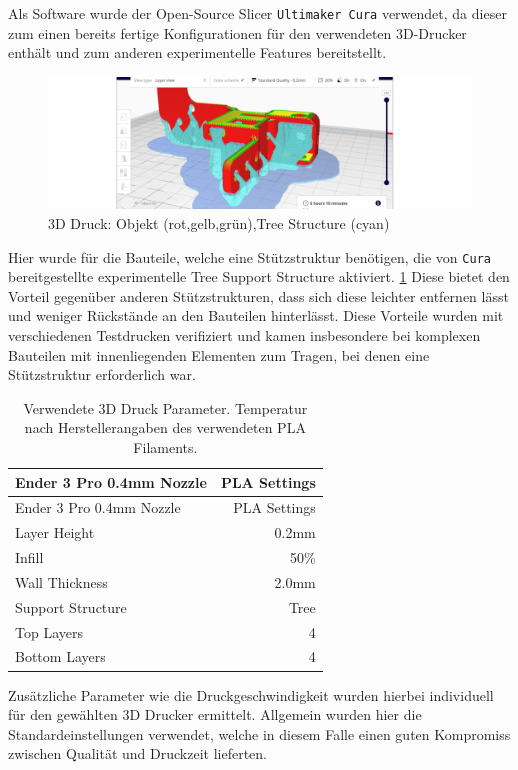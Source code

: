 Als Software wurde der Open-Source Slicer
\passthrough{\lstinline!Ultimaker Cura!}\cite{ultimakercura}
verwendet, da dieser zum einen bereits fertige Konfigurationen für den
verwendeten 3D-Drucker enthält und zum anderen experimentelle Features
bereitstellt.

\begin{figure}
\centering
\includegraphics{images/3d_print_tree_structure.png}
\caption{3D Druck: Objekt (rot,gelb,grün),Tree Structure (cyan)
\label{3d_print_tree_structure}}
\end{figure}

Hier wurde für die Bauteile, welche eine Stützstruktur benötigen, die
von \passthrough{\lstinline!Cura!} bereitgestellte experimentelle Tree
Support Structure aktiviert. \ref{3d_print_tree_structure} Diese bietet
den Vorteil gegenüber anderen Stützstrukturen, dass sich diese leichter
entfernen lässt und weniger Rückstände an den Bauteilen hinterlässt.
Diese Vorteile wurden mit verschiedenen Testdrucken verifiziert und
kamen insbesondere bei komplexen Bauteilen mit innenliegenden Elementen
zum Tragen, bei denen eine Stützstruktur erforderlich war.

\begin{longtable}[]{@{}lr@{}}
\caption{Verwendete 3D Druck Parameter. Temperatur nach
Herstellerangaben des verwendeten PLA Filaments.
\label{3dprintsettings}}\tabularnewline
\toprule
Ender 3 Pro 0.4mm Nozzle & PLA Settings\tabularnewline
\midrule
\endfirsthead
\toprule
Ender 3 Pro 0.4mm Nozzle & PLA Settings\tabularnewline
\midrule
\endhead
Layer Height & 0.2mm\tabularnewline
Infill & 50\%\tabularnewline
Wall Thickness & 2.0mm\tabularnewline
Support Structure & Tree\tabularnewline
Top Layers & 4\tabularnewline
Bottom Layers & 4\tabularnewline
\bottomrule
\end{longtable}

Zusätzliche Parameter wie die Druckgeschwindigkeit wurden hierbei
individuell für den gewählten 3D Drucker ermittelt. Allgemein wurden
hier die Standardeinstellungen verwendet, welche in diesem Falle einen
guten Kompromiss zwischen Qualität und Druckzeit lieferten.


